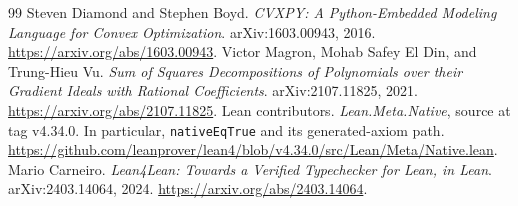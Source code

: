 \documentclass[11pt,a4paper]{article}
\newcommand{\code}[1]{\texttt{#1}}
\begin{document}
\begin{thebibliography}{99}
 Steven Diamond and Stephen Boyd. \emph{CVXPY: A Python-Embedded Modeling Language for Convex Optimization}. arXiv:1603.00943, 2016. \url{https://arxiv.org/abs/1603.00943}.
 Victor Magron, Mohab Safey El Din, and Trung-Hieu Vu. \emph{Sum of Squares Decompositions of Polynomials over their Gradient Ideals with Rational Coefficients}. arXiv:2107.11825, 2021. \url{https://arxiv.org/abs/2107.11825}.
 Lean contributors. \emph{Lean.Meta.Native}, source at tag v4.34.0. In particular, \code{nativeEqTrue} and its generated-axiom path. \url{https://github.com/leanprover/lean4/blob/v4.34.0/src/Lean/Meta/Native.lean}.
 Mario Carneiro. \emph{Lean4Lean: Towards a Verified Typechecker for Lean, in Lean}. arXiv:2403.14064, 2024. \url{https://arxiv.org/abs/2403.14064}.
\end{thebibliography}
\end{document}
